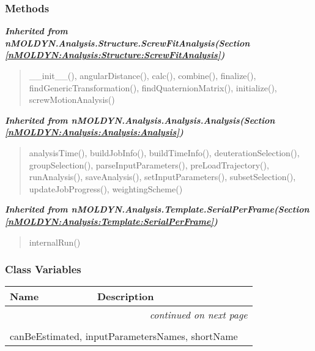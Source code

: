 
  \subsubsection{Methods}


\large{\textbf{\textit{Inherited from nMOLDYN.Analysis.Structure.ScrewFitAnalysis\textit{(Section \ref{nMOLDYN:Analysis:Structure:ScrewFitAnalysis})}}}}

\begin{quote}
\_\_init\_\_(), angularDistance(), calc(), combine(), finalize(), findGenericTransformation(), findQuaternionMatrix(), initialize(), screwMotionAnalysis()
\end{quote}

\large{\textbf{\textit{Inherited from nMOLDYN.Analysis.Analysis.Analysis\textit{(Section \ref{nMOLDYN:Analysis:Analysis:Analysis})}}}}

\begin{quote}
analysisTime(), buildJobInfo(), buildTimeInfo(), deuterationSelection(), groupSelection(), parseInputParameters(), preLoadTrajectory(), runAnalysis(), saveAnalysis(), setInputParameters(), subsetSelection(), updateJobProgress(), weightingScheme()
\end{quote}

\large{\textbf{\textit{Inherited from nMOLDYN.Analysis.Template.SerialPerFrame\textit{(Section \ref{nMOLDYN:Analysis:Template:SerialPerFrame})}}}}

\begin{quote}
internalRun()
\end{quote}


  \subsubsection{Class Variables}

    \vspace{-1cm}
\hspace{\varindent}\begin{longtable}{|p{\varnamewidth}|p{\vardescrwidth}|l}
\cline{1-2}
\cline{1-2} \centering \textbf{Name} & \centering \textbf{Description}& \\
\cline{1-2}
\endhead\cline{1-2}\multicolumn{3}{r}{\small\textit{continued on next page}}\\\endfoot\cline{1-2}
\endlastfoot\multicolumn{2}{|l|}{\textit{Inherited from nMOLDYN.Analysis.Structure.ScrewFitAnalysis \textit{(Section \ref{nMOLDYN:Analysis:Structure:ScrewFitAnalysis})}}}\\
\multicolumn{2}{|p{\varwidth}|}{\raggedright canBeEstimated, inputParametersNames, shortName}\\
\cline{1-2}
\end{longtable}

